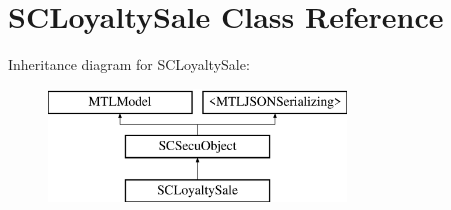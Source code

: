 \hypertarget{interface_s_c_loyalty_sale}{}\section{S\+C\+Loyalty\+Sale Class Reference}
\label{interface_s_c_loyalty_sale}
Inheritance diagram for S\+C\+Loyalty\+Sale\+:\begin{figure}[H]
\begin{center}
\leavevmode
\includegraphics[height=3.000000cm]{interface_s_c_loyalty_sale}
\end{center}
\end{figure}
